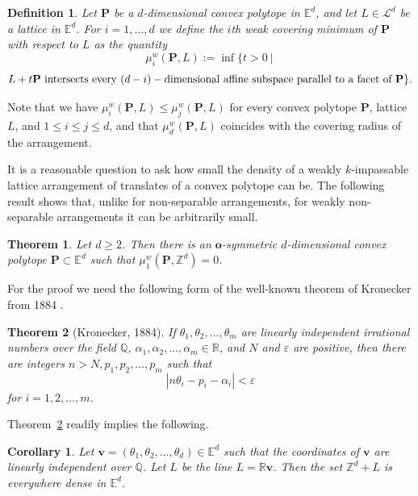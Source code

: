 \documentclass[12pt]{article}
\newtheorem{cor}{Corollary}
\newtheorem{thm}{Theorem}
\newtheorem{defn}{Definition}
\renewcommand{\Re}{\mathbb{R}}
\newcommand{\Ee}{{\mathbb E}}
\renewcommand{\o}{\mathbf{o}}
\begin{document}
\begin{defn}\label{defn:WNScovmin}
Let $\mathbf{P}$ be a $d$-dimensional convex polytope in $\Ee^d$, and let $L \in \mathcal{L}^d$ be a lattice in $\Ee^d$. For $i=1,\ldots, d$ we define the \emph{$i$th weak covering minimum} of $\mathbf{P}$ with respect to $L$ as the quantity
\[
\mu_i^w(\mathbf{P},L) := \inf \{ t > 0 \ |\ 
\]
\[
L + t\mathbf{P} \hbox{ intersects every } (d-i)-\hbox{dimensional affine subspace parallel to a facet of } \mathbf{P} \}.
\]
\end{defn}

Note that we have $\mu_i^w(\mathbf{P},L) \leq \mu_j^w(\mathbf{P},L)$ for every convex polytope $\mathbf{P}$, lattice $L$, and $1 \leq i \leq j \leq d$, and that $\mu_d^w(\mathbf{P},L)$ coincides with the covering radius of the arrangement.

It is a reasonable question to ask how small the density of a weakly $k$-impassable lattice arrangement of translates of a convex polytope can be. The following result shows that, unlike for non-separable arrangements, for weakly non-separable arrangements it can be arbitrarily small.

\begin{thm}\label{thm:WNSnolattice}
Let $d \geq 2$. Then there is an $\o$-symmetric $d$-dimensional convex polytope $\mathbf{P} \subset \Ee^d$ such that $\mu_1^w(\mathbf{P},\mathbb{Z}^d) = 0$.
\end{thm}

For the proof we need the following form of the well-known theorem of Kronecker from 1884 \cite[Theorem 442]{HW}.

\begin{thm}[Kronecker, 1884]\label{thm:Kronecker}
If $\theta_1, \theta_2, \ldots, \theta_m$ are linearly independent irrational numbers over the field $\mathbb{Q}$, $\alpha_1, \alpha_2, \ldots, \alpha_m \in \Re$, and $N$ and $\varepsilon$ are positive, then there are integers $n>N, p_1,p_2, \ldots, p_m$ such that
\[
\left| n \theta_i - p_i - \alpha_i \right| < \varepsilon
\]
for $i=1,2,\ldots,m$.
\end{thm}

Theorem~\ref{thm:Kronecker} readily implies the following.

\begin{cor}\label{cor:Kronecker}
Let $\mathbf{v} = (\theta_1,\theta_2,\ldots, \theta_d) \in \Ee^d$ such that the coordinates of $\mathbf{v}$ are linearly independent over $\mathbb{Q}$. Let $L$ be the line $L= \mathbb{R} \mathbf{v}$. Then the set $\mathbb{Z}^d + L$ is everywhere dense in $\Ee^d$.
\end{cor}
\end{document}
